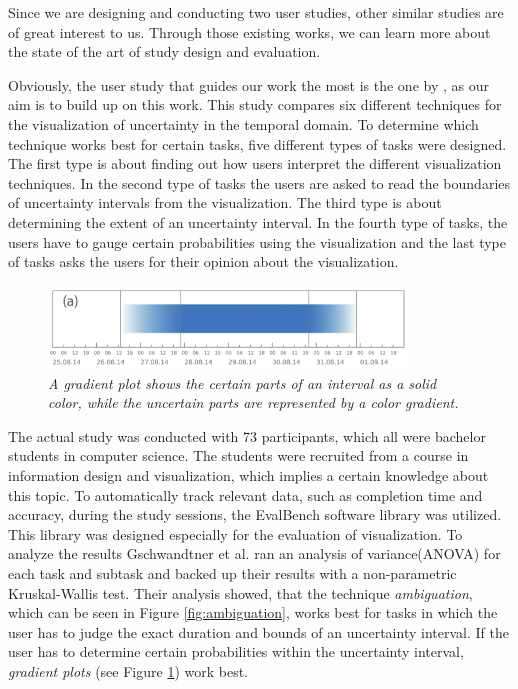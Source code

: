 Since we are designing and conducting two user studies, other similar studies are of great interest to us. Through those existing works, we can learn more about the state of the art of study design and evaluation. \par \medskip

Obviously, the user study that guides our work the most is the one by \citet{gschwandtner2016visual}, as our aim is to build up on this work. This study compares six different techniques for the visualization of uncertainty in the temporal domain. To determine which technique works best for certain tasks, five different types of tasks were designed. The first type is about finding out how users interpret the different visualization techniques. In the second type of tasks the users are asked to read the boundaries of uncertainty intervals from the visualization. The third type is about determining the extent of an uncertainty interval. In the fourth type of tasks, the users have to gauge certain probabilities using the visualization and the last type of tasks asks the users for their opinion about the visualization. \par \medskip

\begin{figure}[H]
	\centering
	\includegraphics[width=0.85\textwidth]{figures/gradientplot.png}
	\caption{\textit{A gradient plot shows the certain parts of an interval as a solid color, while the uncertain parts are represented by a color gradient. \cite{gschwandtner2016visual}}}
	\label{fig:gradientplot}
\end{figure}

The actual study was conducted with 73 participants, which all were bachelor students in computer science. The students were recruited from a course in information design and visualization, which implies a certain knowledge about this topic. To automatically track relevant data, such as completion time and accuracy, during the study sessions, the EvalBench software library \cite{aigner2013evalbench} was utilized. This library was designed especially for the evaluation of visualization. To analyze the results Gschwandtner et al. ran an analysis of variance(ANOVA) for each task and subtask and backed up their results with a non-parametric Kruskal-Wallis test. Their analysis showed, that the technique \textit{ambiguation}, which can be seen in Figure \ref{fig:ambiguation}, works best for tasks in which the user has to judge the exact duration and bounds of an uncertainty interval. If the user has to determine certain probabilities within the uncertainty interval, \textit{gradient plots} (see Figure \ref{fig:gradientplot}) work best. \par \medskip

